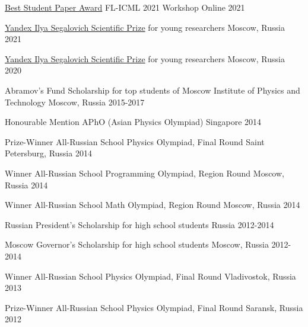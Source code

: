 


\begin{cvhonors}
\cvhonor
{\href{http://federated-learning.org/fl-icml-2021/}{Best Student Paper Award}}
{FL-ICML  2021 Workshop}
{Online}
{2021}	

\cvhonor
{\href{https://yandex.ru/scholarships/scholars}{Yandex Ilya Segalovich Scientific Prize}}
{for young researchers}
{Moscow, Russia}
{2021}
	
\cvhonor
{\href{https://yandex.ru/scholarships/scholars}{Yandex Ilya Segalovich Scientific Prize}}
{for young researchers}
{Moscow, Russia}
{2020}

\cvhonor
{Abramov’s Fund Scholarship}
{for top students of Moscow Institute of Physics and Technology}
{Moscow, Russia}
{2015-2017}

\cvhonor
{Honourable Mention} %
{APhO (Asian Physics Olympiad)} %
{Singapore} %
{2014} %

\cvhonor
{Prize-Winner} %
{All-Russian School Physics Olympiad, Final Round} %
{Saint Petersburg, Russia} %
{2014} %

\cvhonor
{Winner} %
{All-Russian School Programming Olympiad, Region Round} %
{Moscow, Russia} %
{2014} %

\cvhonor
{Winner} %
{All-Russian School Math Olympiad, Region Round} %
{Moscow, Russia} %
{2014} %

	
\cvhonor
{Russian President's Scholarship}
{for high school students}
{Russia}
{2012-2014}

\cvhonor
{Moscow Governor’s Scholarship}
{for high school students}
{Moscow, Russia}
{2012-2014}

\cvhonor
{Winner} %
{All-Russian School Physics Olympiad, Final Round} %
{Vladivostok, Russia} %
{2013} %

\cvhonor
{Prize-Winner} %
{All-Russian School Physics Olympiad, Final Round} %
{Saransk, Russia} %
{2012} %





\end{cvhonors}